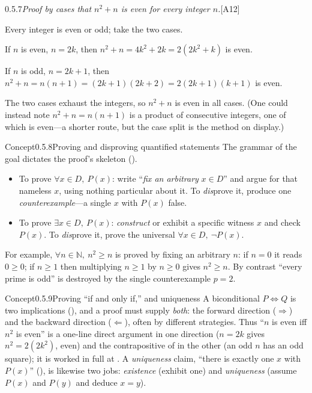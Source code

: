 \documentclass[main.tex]{subfiles}
\begin{document}
\begin{Prf}{0.5.7}{\itshape Proof by cases that $n^2+n$ is even for every integer $n$.}{[A12]}
\item Every integer is even or odd; take the two cases.
\item If $n$ is even, $n=2k$, then $n^2+n=4k^2+2k=2(2k^2+k)$ is even.
\item If $n$ is odd, $n=2k+1$, then
$n^2+n=n(n+1)=(2k+1)(2k+2)=2(2k+1)(k+1)$ is even.
\item The two cases exhaust the integers, so $n^2+n$ is even in all cases. (One could instead note
$n^2+n=n(n+1)$ is a product of consecutive integers, one of which is even---a shorter route, but the
case split is the method on display.)
\end{Prf}

\begin{ObjL}{Concept}{0.5.8}{Proving and disproving quantified statements}
The grammar of the goal dictates the proof's skeleton ().
\begin{itemize}
  \item To prove $\forall x\in D,\ P(x)$: write ``\emph{fix an arbitrary} $x\in D$'' and argue for
        that nameless $x$, using nothing particular about it. To \emph{dis}prove it, produce one
        \emph{counterexample}---a single $x$ with $P(x)$ false.
  \item To prove $\exists x\in D,\ P(x)$: \emph{construct} or exhibit a specific witness $x$ and check
        $P(x)$. To \emph{dis}prove it, prove the universal $\forall x\in D,\ \neg P(x)$.
\end{itemize}
For example, $\forall n\in\mathbb N,\ n^2\ge n$ is proved by fixing an arbitrary $n$: if $n=0$ it
reads $0\ge0$; if $n\ge1$ then multiplying $n\ge1$ by $n\ge0$ gives $n^2\ge n$. By contrast ``every
prime is odd'' is destroyed by the single counterexample $p=2$.
\end{ObjL}

\begin{ObjL}{Concept}{0.5.9}{Proving ``if and only if,'' and uniqueness}
A biconditional $P\Leftrightarrow Q$ is two implications (), and a proof must supply
\emph{both}: the forward direction ($\Rightarrow$) and the backward direction ($\Leftarrow$), often
by different strategies. Thus ``$n$ is even iff $n^2$ is even'' is a one-line direct argument in one
direction ($n=2k$ gives $n^2=2(2k^2)$, even) and the contrapositive of  in the other (an
odd $n$ has an odd square); it is worked in full at . A \emph{uniqueness} claim, ``there is exactly one $x$ with $P(x)$'' (), is likewise
two jobs: \emph{existence} (exhibit one) and \emph{uniqueness} (assume $P(x)$ and $P(y)$ and deduce
$x=y$).
\end{ObjL}
\end{document}
